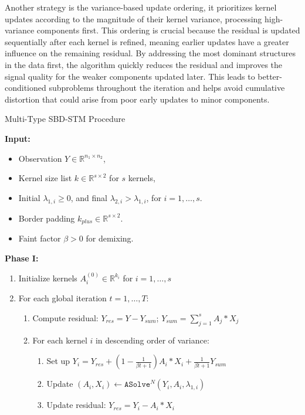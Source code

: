 Another strategy is the variance-based update ordering, it prioritizes kernel updates according to the magnitude of their kernel variance, processing high-variance components first. This ordering is crucial because the residual is updated sequentially after each kernel is refined, meaning earlier updates have a greater influence on the remaining residual. By addressing the most dominant structures in the data first, the algorithm quickly reduces the residual and improves the signal quality for the weaker components updated later. This leads to better-conditioned subproblems throughout the iteration and helps avoid cumulative distortion that could arise from poor early updates to minor components.

\begin{algorithm}
	\label{MTSBDalgo}
	\caption{Multi-Type SBD-STM Procedure}
	\textbf{Input:}
	\begin{itemize}
		\item Observation $Y \in \mathbb{R}^{n_1 \times n_2}$,
		\item Kernel size list $k \in \mathbb{R}^{s \times 2}$ for $s$ kernels,
		\item Initial $\lambda_{1,i} \geq 0$, and final $\lambda_{2,i} > \lambda_{1,i}$, for $i=1,\dots,s$.
		\item Border padding $k_{plus} \in \mathbb{R}^{s \times 2}$.
		\item Faint factor $\beta > 0 $ for demixing.
	\end{itemize}
	
	\textbf{Phase I:}
	\begin{enumerate}
		\item Initialize kernels $A^{(0)}_i \in \mathbb{R}^{k_i}$ for $i=1,\dots,s$
		\item For each global iteration $t=1,\dots,T$:
		\begin{enumerate}
			\item Compute residual: $Y_{res} = Y - Y_{sum}$; $Y_{sum} = \sum_{j=1}^s A_j * X_j$
			\item For each kernel $i$ in descending order of variance:
			\begin{enumerate}
				\item Set up $Y_{i} = Y_{res} + (1-\frac{1}{\beta t+1})A_i * X_i + \frac{1}{\beta t+1}Y_{sum}$
				\item Update $(A_i, X_i) \leftarrow \texttt{ASolve}^N(Y_{i}, A_i, \lambda_{1,i})$
				\item Update residual: $Y_{res} = Y_{i} - A_i * X_i$
			\end{enumerate}
		\end{enumerate}
	\end{enumerate}
	

\end{algorithm}
